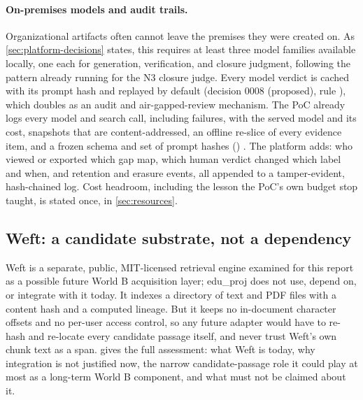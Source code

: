 \paragraph{On-premises models and audit trails.}
Organizational artifacts often cannot leave the premises they were created on. As
\cref{sec:platform-decisions} states, this requires at least three model families available
locally, one each for generation, verification, and closure judgment, following the pattern
already running for the N3 closure judge. Every model verdict is cached with its prompt hash and
replayed by default (decision 0008 (proposed), rule ), which
doubles as an audit and air-gapped-review mechanism. The PoC already logs every model and search
call, including failures, with the served model and its cost, snapshots that are
content-addressed, an offline re-slice of every evidence item, and a frozen schema and set of
prompt hashes () \evobs. The platform adds: who viewed or
exported which gap map, which human verdict changed which label and when, and retention and
erasure events, all appended to a tamper-evident, hash-chained log. Cost headroom, including the
lesson the PoC's own budget stop taught, is stated once, in \cref{sec:resources}.

\subsection{Weft: a candidate substrate, not a dependency}
\label{sec:platform-weft}

Weft is a separate, public, MIT-licensed retrieval engine examined for this report as a possible
future World B acquisition layer; edu\_proj does not use, depend on, or integrate with it today.
It indexes a directory of text and PDF files with a content hash and a computed lineage. But it
keeps no in-document character offsets and no per-user access control, so any future adapter would
have to re-hash and re-locate every candidate passage itself, and never trust Weft's own chunk text
as a span.  gives the full assessment: what Weft is today, why integration is not
justified now, the narrow candidate-passage role it could play at most as a long-term World B
component, and what must not be claimed about it.

